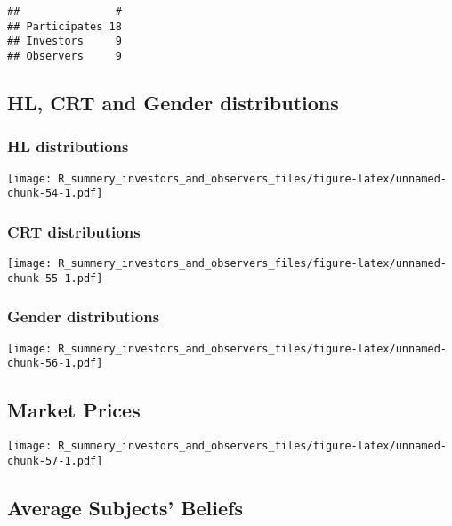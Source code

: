 \documentclass[]{article}
\begin{document}
\begin{verbatim}
##               #
## Participates 18
## Investors     9
## Observers     9
\end{verbatim}

\hypertarget{hl-crt-and-gender-distributions-4}{%
\subsection{HL, CRT and Gender
distributions}\label{hl-crt-and-gender-distributions-4}}

\hypertarget{hl-distributions-4}{%
\subsubsection{HL distributions}\label{hl-distributions-4}}

\texttt{[image: R\_summery\_investors\_and\_observers\_files/figure-latex/unnamed-chunk-54-1.pdf]}

\hypertarget{crt-distributions-4}{%
\subsubsection{CRT distributions}\label{crt-distributions-4}}

\texttt{[image: R\_summery\_investors\_and\_observers\_files/figure-latex/unnamed-chunk-55-1.pdf]}

\hypertarget{gender-distributions-4}{%
\subsubsection{Gender distributions}\label{gender-distributions-4}}

\texttt{[image: R\_summery\_investors\_and\_observers\_files/figure-latex/unnamed-chunk-56-1.pdf]}

\hypertarget{market-prices-4}{%
\subsection{Market Prices}\label{market-prices-4}}

\texttt{[image: R\_summery\_investors\_and\_observers\_files/figure-latex/unnamed-chunk-57-1.pdf]}

\hypertarget{average-subjects-beliefs-4}{%
\subsection{Average Subjects'
Beliefs}\label{average-subjects-beliefs-4}}
\end{document}
